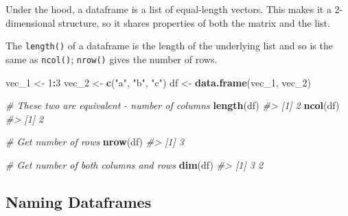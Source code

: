 \documentclass[
]{book}
\newenvironment{Shaded}{\begin{snugshade}}{\end{snugshade}}
\newcommand{\CommentTok}[1]{\textcolor[rgb]{0.56,0.35,0.01}{\textit{#1}}}
\newcommand{\DecValTok}[1]{\textcolor[rgb]{0.00,0.00,0.81}{#1}}
\newcommand{\KeywordTok}[1]{\textcolor[rgb]{0.13,0.29,0.53}{\textbf{#1}}}
\newcommand{\NormalTok}[1]{#1}
\newcommand{\OperatorTok}[1]{\textcolor[rgb]{0.81,0.36,0.00}{\textbf{#1}}}
\newcommand{\StringTok}[1]{\textcolor[rgb]{0.31,0.60,0.02}{#1}}
\begin{document}
Under the hood, a dataframe is a list of equal-length vectors. This makes it a 2-dimensional structure, so it shares properties of both the matrix and the list.

\begin{Shaded}
\end{Shaded}

The \texttt{length()} of a dataframe is the length of the underlying list and so is the same as \texttt{ncol()}; \texttt{nrow()} gives the number of rows.

\begin{Shaded}
\begin{Highlighting}[]
\NormalTok{vec_}\DecValTok{1}\NormalTok{ <-}\StringTok{ }\DecValTok{1}\OperatorTok{:}\DecValTok{3}
\NormalTok{vec_}\DecValTok{2}\NormalTok{ <-}\StringTok{ }\KeywordTok{c}\NormalTok{(}\StringTok{"a"}\NormalTok{, }\StringTok{"b"}\NormalTok{, }\StringTok{"c"}\NormalTok{)}
\NormalTok{df <-}\StringTok{ }\KeywordTok{data.frame}\NormalTok{(vec_}\DecValTok{1}\NormalTok{, vec_}\DecValTok{2}\NormalTok{)}

\CommentTok{# These two are equivalent - number of columns}
\KeywordTok{length}\NormalTok{(df)}
\CommentTok{#> [1] 2}
\KeywordTok{ncol}\NormalTok{(df)}
\CommentTok{#> [1] 2}

\CommentTok{# Get number of rows}
\KeywordTok{nrow}\NormalTok{(df)}
\CommentTok{#> [1] 3}

\CommentTok{# Get number of both columns and rows}
\KeywordTok{dim}\NormalTok{(df)}
\CommentTok{#> [1] 3 2}
\end{Highlighting}
\end{Shaded}

\hypertarget{naming-dataframes}{%
\subsection{Naming Dataframes}\label{naming-dataframes}}
\end{document}

